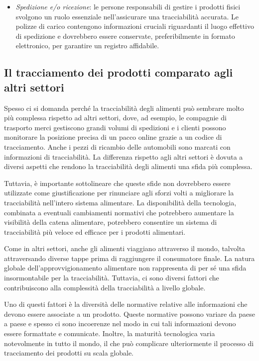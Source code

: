 \begin{itemize}
    \item \textit{Spedizione e/o ricezione}: le persone responsabili di gestire i prodotti fisici svolgono un ruolo essenziale nell'assicurare una tracciabilità accurata. Le polizze di carico contengono informazioni cruciali riguardanti il luogo effettivo di spedizione e dovrebbero essere conservate, preferibilmente in formato elettronico, per garantire un registro affidabile.    
    
\end{itemize}

\subsection{Il tracciamento dei prodotti comparato agli altri settori}

Spesso ci si domanda perché la tracciabilità degli alimenti può sembrare molto più complessa rispetto ad altri settori, dove, ad esempio, le compagnie di trasporto merci gestiscono grandi volumi di spedizioni e i clienti possono monitorare la posizione precisa di un pacco online grazie a un codice di tracciamento. Anche i pezzi di ricambio delle automobili sono marcati con informazioni di tracciabilità. La differenza rispetto agli altri settori è dovuta a diversi aspetti che rendono la tracciabilità degli alimenti una sfida più complessa.

Tuttavia, è importante sottolineare che queste sfide non dovrebbero essere utilizzate come giustificazione per rinunciare agli sforzi volti a migliorare la tracciabilità nell'intero sistema alimentare. La disponibilità della tecnologia, combinata a eventuali cambiamenti normativi che potrebbero aumentare la visibilità della catena alimentare, potrebbero consentire un sistema di tracciabilità più veloce ed efficace per i prodotti alimentari.

Come in altri settori, anche gli alimenti viaggiano attraverso il mondo, talvolta attraversando diverse tappe prima di raggiungere il consumatore finale. La natura globale dell'approvvigionamento alimentare non rappresenta di per sé una sfida insormontabile per la tracciabilità. Tuttavia, ci sono diversi fattori che contribuiscono alla complessità della tracciabilità a livello globale.

Uno di questi fattori è la diversità delle normative relative alle informazioni che devono essere associate a un prodotto. Queste normative possono variare da paese a paese e spesso ci sono incoerenze nel modo in cui tali informazioni devono essere formattate e comunicate. Inoltre, la maturità tecnologica varia notevolmente in tutto il mondo, il che può complicare ulteriormente il processo di tracciamento dei prodotti su scala globale.

